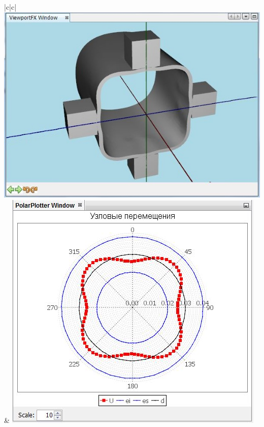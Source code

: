 \documentclass[14pt,oneside,final]{extreport}
\begin{document}
		\begin{table}[]
			\centering
			\caption{Испытание подсистемы моделирования: число кулачков}
			\label{tab:modeling-tests}{
				{\tabulinesep=1.2mm
					\begin{tabu}[]{|c|c|}
						\hline
						 \\ \hline
						\includegraphics[scale=0.55]{img/simulation-jaw-test-model1} & \includegraphics[scale=0.55]{img/simulation-jaw-test-graph1}  \\ 
						\hline
						 \\ \hline

\end{tabu}}}
\end{table}
\end{document}
